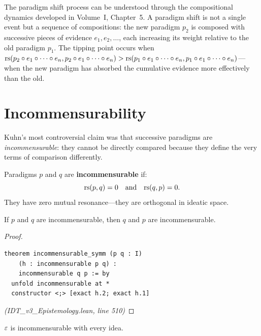 \begin{remark}
The paradigm shift process can be understood through the compositional dynamics
developed in Volume~I, Chapter~5. A paradigm shift is not a single event but a
sequence of compositions: the new paradigm $p_2$ is composed with successive
pieces of evidence $e_1, e_2, \ldots$, each increasing its weight relative to
the old paradigm $p_1$. The tipping point occurs when
$\mathrm{rs}(p_2 \circ e_1 \circ \cdots \circ e_n, p_2 \circ e_1 \circ
\cdots \circ e_n) > \mathrm{rs}(p_1 \circ e_1 \circ \cdots \circ e_n,
p_1 \circ e_1 \circ \cdots \circ e_n)$---when the new paradigm has
absorbed the cumulative evidence more effectively than the old.
\end{remark}


\section{Incommensurability}

Kuhn's most controversial claim was that successive paradigms are
\emph{incommensurable}: they cannot be directly compared because they define
the very terms of comparison differently.

\begin{definition}[Incommensurability]
\label{def:incommensurability}
Paradigms $p$ and $q$ are \textbf{incommensurable} if:
\[
  \mathrm{rs}(p, q) = 0 \quad\text{and}\quad \mathrm{rs}(q, p) = 0.
\]
They have zero mutual resonance---they are orthogonal in ideatic space.
\end{definition}

\begin{theorem}
\label{thm:incommensurable-symm}
If $p$ and $q$ are incommensurable, then $q$ and $p$ are incommensurable.
\end{theorem}

\begin{proof}
\begin{lstlisting}
theorem incommensurable_symm (p q : I)
    (h : incommensurable p q) :
    incommensurable q p := by
  unfold incommensurable at *
  constructor <;> [exact h.2; exact h.1]
\end{lstlisting}
\textit{(IDT\_v3\_Epistemology.lean, line 510)}
\end{proof}

\begin{theorem}
\label{thm:void-incommensurable}
$\varepsilon$ is incommensurable with every idea.
\end{theorem}

